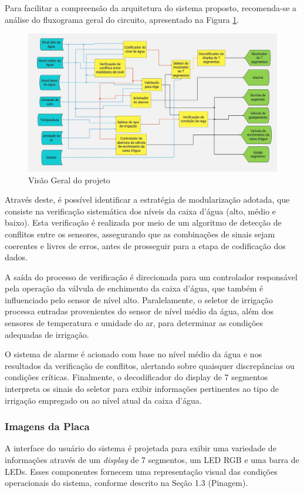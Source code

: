 \documentclass[
	article,			%
	11pt,				%
	oneside,			%
	a4paper,			%
	english,			%
	brazil,				%
	sumario=tradicional
	]{abntex2}
\begin{document}
Para facilitar a compreensão da arquitetura do sistema proposto, recomenda-se a análise do fluxograma geral do circuito, apresentado na Figura \ref{fig:overview}.
\begin{figure}[H]
    \centering
    \includegraphics[width=0.75\linewidth]{full-view.png}
    \caption{Visão Geral do projeto}
    \label{fig:overview}
\end{figure}

Através deste, é possível identificar a estratégia de modularização adotada, que consiste na verificação sistemática dos níveis da caixa d’água (alto, médio e baixo). Esta verificação é realizada por meio de um algoritmo de detecção de conflitos entre os sensores, assegurando que as combinações de sinais sejam coerentes e livres de erros, antes de prosseguir para a etapa de codificação dos dados.

A saída do processo de verificação é direcionada para um controlador responsável pela operação da válvula de enchimento da caixa d’água, que também é influenciado pelo sensor de nível alto. Paralelamente, o seletor de irrigação processa entradas provenientes do sensor de nível médio da água, além dos sensores de temperatura e umidade do ar, para determinar as condições adequadas de irrigação.

O sistema de alarme é acionado com base no nível médio da água e nos resultados da verificação de conflitos, alertando sobre quaisquer discrepâncias ou condições críticas. Finalmente, o decodificador do display de 7 segmentos interpreta os sinais do seletor para exibir informações pertinentes ao tipo de irrigação empregado ou ao nível atual da caixa d’água.

\subsubsection{Imagens da Placa}

A interface do usuário do sistema é projetada para exibir uma variedade de informações através de um \textit{display} de 7 segmentos, um LED RGB e uma barra de LEDs. Esses componentes fornecem uma representação visual das condições operacionais do sistema, conforme descrito na Seção 1.3 (Pinagem).
\end{document}
